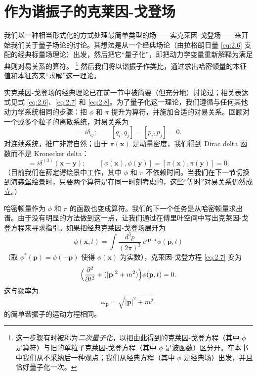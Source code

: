 \section{作为谐振子的克莱因-戈登场}

我们以一种相当形式化的方式处理最简单类型的场——实克莱因-戈登场——来开始我们关于量子场论的讨论。其想法是从一个经典场论（由拉格朗日量 \eqref{eq:2.6} 支配的经典标量场理论）出发，然后把它``量子化''，即把动力学变量重新解释为满足典则对易关系的算符。%
\footnote{这一步骤有时被称为\emph{二次量子化}，以把由此得到的克莱因-戈登方程（其中 $\phi$ 是算符）与旧的单粒子克莱因-戈登方程（其中 $\phi$ 是波函数）区分开。在本书中我们从不采纳后一种观点；我们从经典方程（其中 $\phi$ 是经典场）出发，并且恰好量子化一次。} 然后我们将以谐振子作类比，通过求出哈密顿量的本征值和本征态来``求解''这一理论。

实克莱因-戈登场的经典理论已在前一节中被简要（但充分地）讨论过；相关表达式见式 \eqref{eq:2.6}、\eqref{eq:2.7} 和 \eqref{eq:2.8}。为了量子化这一理论，我们遵循与任何其他动力学系统相同的步骤：把 $\phi$ 和 $\pi$ 提升为算符，并施加合适的对易关系。回顾对一个或多个粒子的离散系统，对易关系为
\begin{equation}
  [q_i, p_j] = i\delta_{ij};\qquad
  [q_i, q_j] = [p_i, p_j] = 0.
\end{equation}
对连续系统，推广非常自然；由于 $\pi(\mathbf{x})$ 是动量密度，我们得到 Dirac delta 函数而不是 Kronecker delta：
\begin{equation}
  [\phi(\mathbf{x}), \pi(\mathbf{y})] = i\delta^{(3)}(\mathbf{x}-\mathbf{y});
  \qquad
  [\phi(\mathbf{x}), \phi(\mathbf{y})]
  = [\pi(\mathbf{x}), \pi(\mathbf{y})] = 0 .
  \label{eq:2.20}
\end{equation}
（目前我们在薛定谔绘景中工作，其中 $\phi$ 和 $\pi$ 不依赖时间。当我们在下一节切换到海森堡绘景时，只要两个算符是在同一时刻考虑的，这些``等时''对易关系仍然成立。）

哈密顿量作为 $\phi$ 和 $\pi$ 的函数也变成算符。我们的下一个任务是从哈密顿量求出谱。由于没有明显的方法做到这一点，让我们通过在傅里叶空间中写出克莱因-戈登方程来寻求指引。如果把经典克莱因-戈登场展开为
\begin{equation}
  \phi(\mathbf{x}, t) = \int \frac{d^3p}{(2\pi)^3}\ e^{i\mathbf{p}\cdot\mathbf{x}}
    \phi(\mathbf{p}, t)
\end{equation}
（取 $\phi^{*}(\mathbf{p}) = \phi(-\mathbf{p})$ 使得 $\phi(\mathbf{x})$ 为实数），克莱因-戈登方程 \eqref{eq:2.7} 变为
\begin{equation}
  \Bigl( \frac{\partial^2}{\partial t^2}
    + (|\mathbf{p}|^2 + m^2) \Bigr)\phi(\mathbf{p}, t) = 0 .
  \label{eq:2.21}
\end{equation}
这与频率为
\begin{equation}
  \omega_{\mathbf{p}} = \sqrt{|\mathbf{p}|^2 + m^2}.
  \label{eq:2.22}
\end{equation}
的简单谐振子的运动方程相同。

